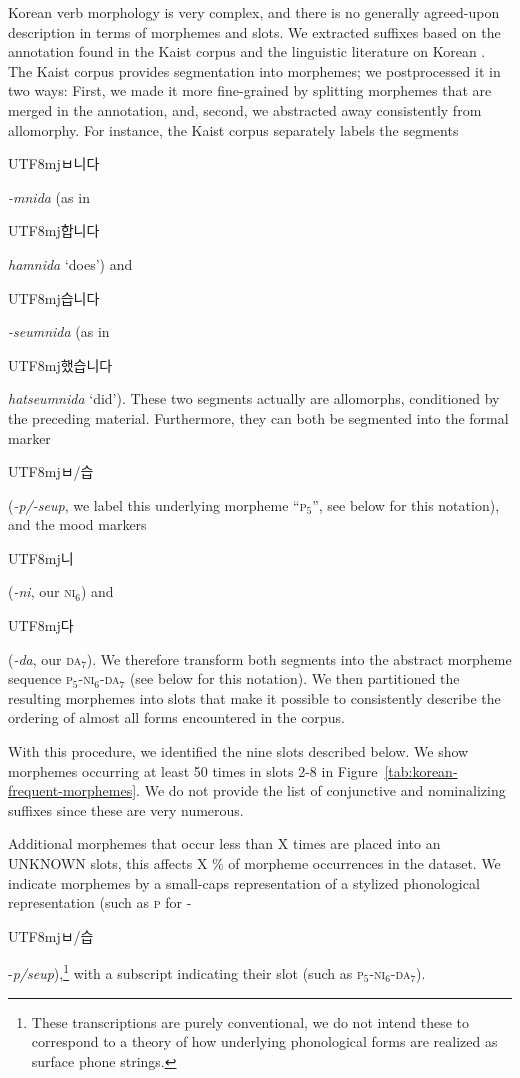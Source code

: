 \documentclass[11pt,letterpaper]{article}
\newcommand{\korean}[1]{\begin{CJK}{UTF8}{mj}#1\end{CJK}}
\begin{document}
Korean verb morphology is very complex, and there is no generally agreed-upon description in terms of morphemes and slots.
We extracted suffixes based on the annotation found in the Kaist corpus and the linguistic literature on Korean \citep{yeon2010korean}.
The Kaist corpus provides segmentation into morphemes; we postprocessed it in two ways:
First, we made it more fine-grained by splitting morphemes that are merged in the annotation, and, second, we abstracted away consistently from allomorphy.
For instance, the Kaist corpus separately labels the segments \korean{ㅂ니다} \textit{-mnida} (as in \korean{합니다} \textit{hamnida} `does') and \korean{습니다} \textit{-seumnida} (as in \korean{했습니다} \textit{hatseumnida} `did').
These two segments actually are allomorphs, conditioned by the preceding material.
Furthermore, they can both be segmented into the formal marker \korean{ㅂ/습} (\textit{-p/-seup}, we label this underlying morpheme ``\textsc{p}$_5$'', see below for this notation), and the mood markers \korean{니} (\textit{-ni}, our \textsc{ni}$_6$) and \korean{다} (\textit{-da}, our \textsc{da}$_7$).
We therefore transform both segments into the abstract morpheme sequence \textsc{p}$_5$-\textsc{ni}$_6$-\textsc{da}$_7$ (see below for this notation).
We then partitioned the resulting morphemes into slots that make it possible to consistently describe the ordering of almost all forms encountered in the corpus.


With this procedure, we identified the nine slots described below. We show morphemes occurring at least 50 times in slots 2-8 in Figure~\ref{tab:korean-frequent-morphemes}.
We do not provide the list of conjunctive and nominalizing suffixes since these are very numerous.

Additional morphemes that occur less than X times are placed into an UNKNOWN slots, this affects X \% of morpheme occurrences in the dataset.
We indicate morphemes by a small-caps representation of a stylized phonological representation (such as \textsc{p} for -\korean{ㅂ/습}  -\textit{p/seup}),\footnote{These transcriptions are purely conventional, we do not intend these to correspond to a theory of how underlying phonological forms are realized as surface phone strings.} with a subscript indicating their slot (such as \textsc{p}$_5$-\textsc{ni}$_6$-\textsc{da}$_7$).
\end{document}

